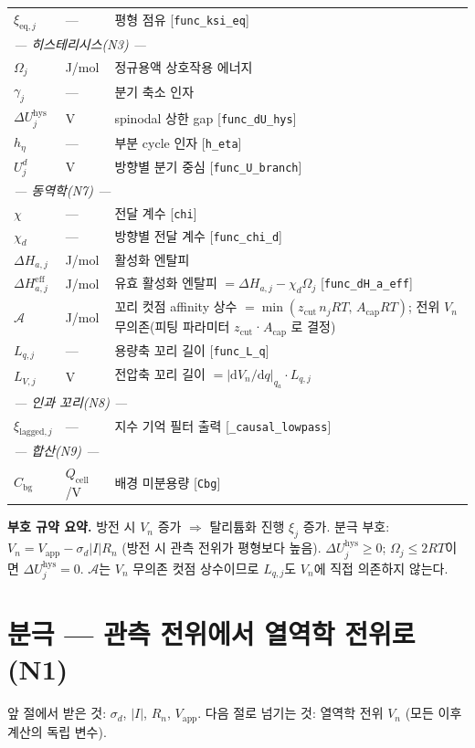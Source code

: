 \documentclass[11pt,a4paper]{article}
\newcommand{\dd}{\mathrm{d}}
\newcommand{\eff}{\mathrm{eff}}
\newcommand{\eq}{\mathrm{eq}}
\newcommand{\app}{\mathrm{app}}
\newcommand{\cell}{\mathrm{cell}}
\newcommand{\bg}{\mathrm{bg}}
\newcommand{\hys}{\mathrm{hys}}
\begin{document}
\begin{longtable}{p{} p{} p{}}
$\xi_{\eq,j}$ & --- & 평형 점유 [\texttt{func\_ksi\_eq}] \\
\multicolumn{3}{l}{\emph{--- 히스테리시스(N3) ---}}\\
$\Omega_j$ & J/mol & 정규용액 상호작용 에너지 \\
$\gamma_j$ & --- & 분기 축소 인자 \\
$\Delta U_j^\hys$ & V & spinodal 상한 gap [\texttt{func\_dU\_hys}] \\
$h_\eta$ & --- & 부분 cycle 인자 [\texttt{h\_eta}] \\
$U_j^d$ & V & 방향별 분기 중심 [\texttt{func\_U\_branch}] \\
\multicolumn{3}{l}{\emph{--- 동역학(N7) ---}}\\
$\chi$ & --- & 전달 계수 [\texttt{chi}] \\
$\chi_d$ & --- & 방향별 전달 계수 [\texttt{func\_chi\_d}] \\
$\Delta H_{a,j}$ & J/mol & 활성화 엔탈피 \\
$\Delta H_{a,j}^{\eff}$ & J/mol & 유효 활성화 엔탈피 $=\Delta H_{a,j}-\chi_d\Omega_j$ [\texttt{func\_dH\_a\_eff}] \\
$\mathcal{A}$ & J/mol & 꼬리 컷점 affinity 상수 $=\min(z_{\mathrm{cut}}\,n_j RT,\,A_{\mathrm{cap}}RT)$;
                         전위 $V_n$ 무의존(피팅 파라미터 $z_{\mathrm{cut}}$·$A_{\mathrm{cap}}$ 로 결정) \\
$L_{q,j}$ & --- & 용량축 꼬리 길이 [\texttt{func\_L\_q}] \\
$L_{V,j}$ & V & 전압축 꼬리 길이 $=|\dd V_n/\dd q|_{q_a}\cdot L_{q,j}$ \\
\multicolumn{3}{l}{\emph{--- 인과 꼬리(N8) ---}}\\
$\xi_{\mathrm{lagged},j}$ & --- & 지수 기억 필터 출력 [\texttt{\_causal\_lowpass}] \\
\multicolumn{3}{l}{\emph{--- 합산(N9) ---}}\\
$C_\bg$ & $Q_\cell$/V & 배경 미분용량 [\texttt{Cbg}] \\
\bottomrule
\end{longtable}

\textbf{부호 규약 요약.}
방전 시 $V_n$ 증가 $\Rightarrow$ 탈리튬화 진행 $\xi_j$ 증가.
분극 부호: $V_n = V_\app - \sigma_d|I|R_n$ (방전 시 관측 전위가 평형보다 높음).
$\Delta U_j^\hys \ge 0$; $\Omega_j \le 2RT$이면 $\Delta U_j^\hys = 0$.
$\mathcal{A}$는 $V_n$ 무의존 컷점 상수이므로 $L_{q,j}$도 $V_n$에 직접 의존하지 않는다.

\section{분극 — 관측 전위에서 열역학 전위로 (N1)}
\label{sec:polar}
앞 절에서 받은 것: $\sigma_d$, $|I|$, $R_n$, $V_\app$.
다음 절로 넘기는 것: 열역학 전위 $V_n$ (모든 이후 계산의 독립 변수).
\end{document}
